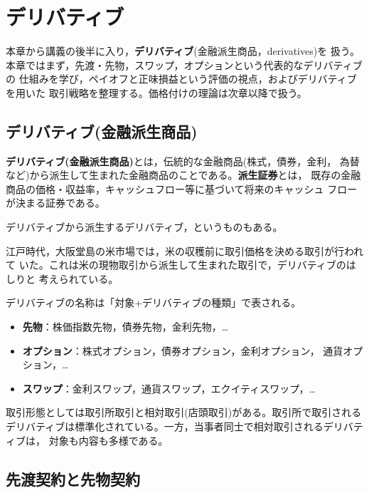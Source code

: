 \chapter{デリバティブ}

本章から講義の後半に入り，\textbf{デリバティブ}(金融派生商品，derivatives)を
扱う。本章ではまず，先渡・先物，スワップ，オプションという代表的なデリバティブの
仕組みを学び，ペイオフと正味損益という評価の視点，およびデリバティブを用いた
取引戦略を整理する。価格付けの理論は次章以降で扱う。

\section{デリバティブ(金融派生商品)}

\begin{definition}[デリバティブ]
\textbf{デリバティブ(金融派生商品)}とは，伝統的な金融商品(株式，債券，金利，
為替など)から派生して生まれた金融商品のことである。\textbf{派生証券}とは，
既存の金融商品の価格・収益率，キャッシュフロー等に基づいて将来のキャッシュ
フローが決まる証券である。
\end{definition}

デリバティブから派生するデリバティブ，というものもある。

\begin{example}[江戸時代の米市場]
江戸時代，大阪堂島の米市場では，米の収穫前に取引価格を決める取引が行われて
いた。これは米の現物取引から派生して生まれた取引で，デリバティブのはしりと
考えられている。
\end{example}

デリバティブの名称は「対象+デリバティブの種類」で表される。
\begin{itemize}
\item \textbf{先物}：株価指数先物，債券先物，金利先物，…
\item \textbf{オプション}：株式オプション，債券オプション，金利オプション，
通貨オプション，…
\item \textbf{スワップ}：金利スワップ，通貨スワップ，エクイティスワップ，…
\end{itemize}

取引形態としては取引所取引と相対取引(店頭取引)がある。取引所で取引される
デリバティブは標準化されている。一方，当事者同士で相対取引されるデリバティブは，
対象も内容も多様である。

\section{先渡契約と先物契約}

